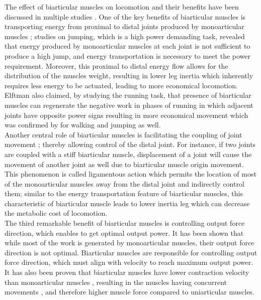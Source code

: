 \documentclass[10pt,letterpaper]{article}
\begin{document}
The effect of biarticular muscles on locomotion and their benefits have been discussed in multiple studies \cite{51,53,57,63}. One of the key benefits of biarticular muscles is transporting energy from proximal to distal joints produced by monoarticular muscles \cite{51,58,59,60,61,62}; studies on jumping, which is a high power demanding task, revealed that energy produced by monoarticular muscles at each joint is not sufficient to produce a high jump\cite{58}, and energy transportation is necessary to meet the power requirement\cite{58}. Moreover, this proximal to distal energy flow allows for the distribution of the muscles weight, resulting in lower leg inertia \cite{62} which inherently requires less energy to be actuated, leading to more economical locomotion\cite{62,53}. Elftman\cite{64} also claimed, by studying the running task, that presence of biarticular muscles can regenerate the negative work in phases of running in which adjacent joints have opposite power signs resulting in more economical movement \cite{65} which was confirmed by \cite{66} for walking and jumping as well. \\
Another central role of biarticular muscles is facilitating the coupling of joint movement \cite{53,57}; thereby allowing control of the distal joint. For instance, if two joints are coupled with a stiff biarticular muscle, displacement of a joint will cause the movement of another joint as well due to biarticular muscle origin movement\cite{57}. This phenomenon is called ligamentous action \cite{67} which permits the location of most of the monoarticular muscles away from the distal joint and indirectly control them\cite{57}; similar to the energy transportation feature of biarticular muscles, this characteristic of biarticular muscle leads to lower inertia leg \cite{57,67} which can decrease the metabolic cost of locomotion.\\
The third remarkable benefit of biarticular muscles is controlling output force direction, which enables to get optimal output power. It has been shown that while most of the work is generated by monoarticular muscles, their output force direction is not optimal\cite{53}. Biarticular muscles are responsible for controlling output force direction\cite{53}, which must align with velocity to reach maximum output power\cite{53}. It has also been proven that biarticular muscles have lower contraction velocity than monoarticular muscles \cite{57}, resulting in the muscles having concurrent movements \cite{68}, and therefore higher muscle force compared to uniarticular muscles\cite{53}. \\
\end{document}
